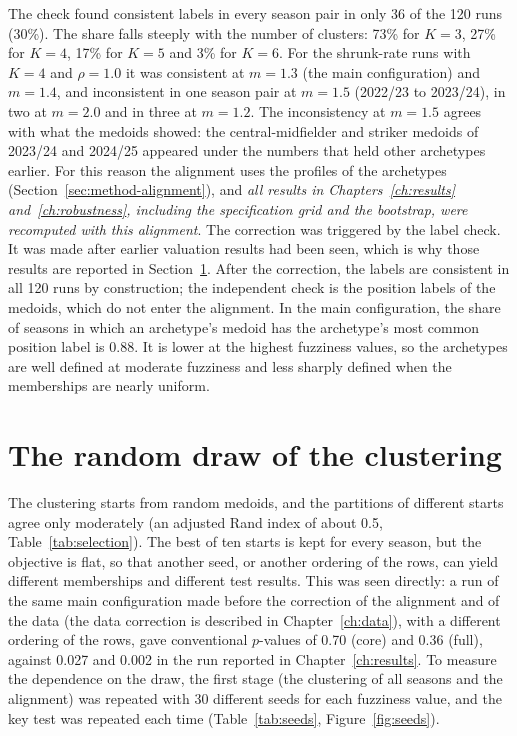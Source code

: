 The check found consistent labels in every season pair in only 36 of the 120 runs (30\%). The share falls steeply with the number of clusters: 73\% for $K=3$, 27\% for $K=4$, 17\% for $K=5$ and 3\% for $K=6$. For the shrunk-rate runs with $K=4$ and $\rho=1.0$ it was consistent at $m=1.3$ (the main configuration) and $m=1.4$, and inconsistent in one season pair at $m=1.5$ (2022/23 to 2023/24), in two at $m=2.0$ and in three at $m=1.2$. The inconsistency at $m=1.5$ agrees with what the medoids showed: the central-midfielder and striker medoids of 2023/24 and 2024/25 appeared under the numbers that held other archetypes earlier. For this reason the alignment uses the profiles of the archetypes (Section~\ref{sec:method-alignment}), and \emph{all results in Chapters~\ref{ch:results} and~\ref{ch:robustness}, including the specification grid and the bootstrap, were recomputed with this alignment}. The correction was triggered by the label check. It was made after earlier valuation results had been seen, which is why those results are reported in Section~\ref{sec:rob-seeds}. After the correction, the labels are consistent in all 120 runs by construction; the independent check is the position labels of the medoids, which do not enter the alignment. In the main configuration, the share of seasons in which an archetype's medoid has the archetype's most common position label is 0.88. It is lower at the highest fuzziness values, so the archetypes are well defined at moderate fuzziness and less sharply defined when the memberships are nearly uniform.

\section{The random draw of the clustering}
\label{sec:rob-seeds}

The clustering starts from random medoids, and the partitions of different starts agree only moderately (an adjusted Rand index of about 0.5, Table~\ref{tab:selection}). The best of ten starts is kept for every season, but the objective is flat, so that another seed, or another ordering of the rows, can yield different memberships and different test results. This was seen directly: a run of the same main configuration made before the correction of the alignment and of the data (the data correction is described in Chapter~\ref{ch:data}), with a different ordering of the rows, gave conventional $p$-values of 0.70 (core) and 0.36 (full), against 0.027 and 0.002 in the run reported in Chapter~\ref{ch:results}. To measure the dependence on the draw, the first stage (the clustering of all seasons and the alignment) was repeated with 30 different seeds for each fuzziness value, and the key test was repeated each time (Table~\ref{tab:seeds}, Figure~\ref{fig:seeds}).

